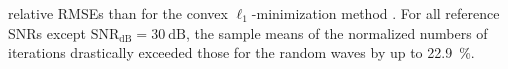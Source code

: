 relative \acp{RMSE} than for
the convex $\ell_{1}$-minimization method
.
%
% 
For
all reference \acp{SNR} except
$\text{SNR}_{\text{dB}} = \SI{30}{\deci\bel}$,
the sample means of
the normalized numbers of
iterations drastically exceeded those for
the random waves by up to
\SI{22.9}{\percent}.
